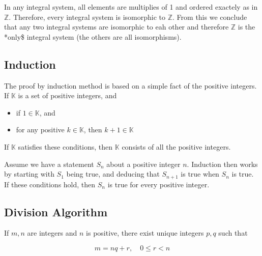 In any integral system, all elements are multiplies of 1 and ordered
exactely as in \(\mathbb{Z}\). Therefore, every integral system is
isomorphic to \(\mathbb{Z}\). From this we conclude that any two
integral systems are isomorphic to eah other and therefore
\(\mathbb{Z}\) is the *only\$ integral system (the others are all
isomorphisms).

\subsection{Induction}\label{induction}

The proof by induction method is based on a simple fact of the positive
integers. If \(\mathbb{K}\) is a set of positive integers, and

\begin{itemize}
\item
  if \(1 \in \mathbb{K}\), and
\item
  for any positive \(k \in \mathbb{K}\), then \(k+1 \in \mathbb{K}\)
\end{itemize}

If \(\mathbb{K}\) satisfies these conditions, then \(\mathbb{K}\)
consists of all the positive integers.

Assume we have a statement \(S_n\) about a positive integer \(n\).
Induction then works by starting with \(S_1\) being true, and deducing
that \(S_{n+1}\) is true when \(S_n\) is true. If these conditions hold,
then \(S_n\) is true for every positive integer.

\subsection{Division Algorithm}\label{division-algorithm}

If \(m,n\) are integers and \(n\) is positive, there exist unique
integers \(p,q\) such that

\[
m=nq + r , \quad 0 \leq r < n
\]
